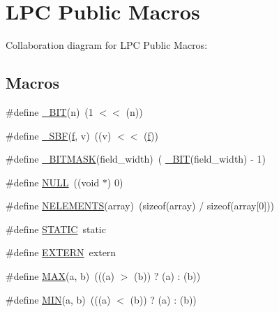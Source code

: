 \hypertarget{group___l_p_c___types___public___macros}{}\section{L\+PC Public Macros}
\label{group___l_p_c___types___public___macros}
Collaboration diagram for L\+PC Public Macros\+:
\subsection*{Macros}
\begin{DoxyCompactItemize}
\item 
\#define \hyperlink{group___l_p_c___types___public___macros_ga7ee022f5e5a971a8324e4b7572d49170}{\+\_\+\+B\+IT}(n)~(1 $<$$<$ (n))
\item 
\#define \hyperlink{group___l_p_c___types___public___macros_ga6caca3483c2ce446900be05ea02e8f49}{\+\_\+\+S\+BF}(\hyperlink{unity_8c_af900396d7b72ff2a7002e8befe8cf8f1}{f},  v)~((v) $<$$<$ (\hyperlink{unity_8c_af900396d7b72ff2a7002e8befe8cf8f1}{f}))
\item 
\#define \hyperlink{group___l_p_c___types___public___macros_ga78ad3421dde54769e8b46d36819ae87a}{\+\_\+\+B\+I\+T\+M\+A\+SK}(field\+\_\+width)~( \hyperlink{group___l_p_c___types___public___macros_ga7ee022f5e5a971a8324e4b7572d49170}{\+\_\+\+B\+IT}(field\+\_\+width) -\/ 1)
\item 
\#define \hyperlink{group___l_p_c___types___public___macros_ga070d2ce7b6bb7e5c05602aa8c308d0c4}{N\+U\+LL}~((void $\ast$) 0)
\item 
\#define \hyperlink{group___l_p_c___types___public___macros_gafdd9296176e56fcfd83c07d345a045a7}{N\+E\+L\+E\+M\+E\+N\+TS}(array)~(sizeof(array) / sizeof(array\mbox{[}0\mbox{]}))
\item 
\#define \hyperlink{group___l_p_c___types___public___macros_ga10b2d890d871e1489bb02b7e70d9bdfb}{S\+T\+A\+T\+IC}~static
\item 
\#define \hyperlink{group___l_p_c___types___public___macros_ga77366c1bd428629dc898e188bfd182a3}{E\+X\+T\+E\+RN}~extern
\item 
\#define \hyperlink{group___l_p_c___types___public___macros_gafa99ec4acc4ecb2dc3c2d05da15d0e3f}{M\+AX}(a,  b)~(((a) $>$ (b)) ? (a) \+: (b))
\item 
\#define \hyperlink{group___l_p_c___types___public___macros_ga3acffbd305ee72dcd4593c0d8af64a4f}{M\+IN}(a,  b)~(((a) $<$ (b)) ? (a) \+: (b))
\end{DoxyCompactItemize}



